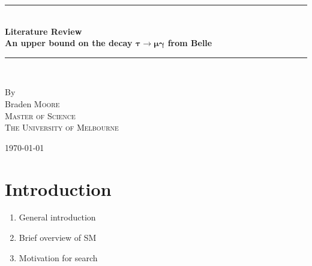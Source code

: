 \documentclass[a4paper]{article} %
\begin{document}
\pagestyle{empty}

\newcommand{\HRule}{\rule{\linewidth}{0.5mm}}

\begin{titlepage}

    \begin{center}
        \vspace*{5cm}

        \HRule \\[0.75cm]
        \huge \textbf{Literature Review} \\[0.5cm]
		\Huge \textbf{An upper bound on the decay $\bm{\tau\to\mu \gamma}$ from Belle}\\[0.5cm]
        \HRule \\[1.5cm]
        \begin{minipage}{0.4\textwidth}
        \begin{center}

        \large By \\[0.75cm]
        \huge Braden \scshape Moore \\[0.5cm]
        \normalsize \normalfont Master of Science \\
        The University of Melbourne \\

        \end{center}
        \end{minipage}

        \vfill

        \large \today
    \end{center}


\newpage
\end{titlepage}
\pagestyle{empty}
\tableofcontents
\newpage

\pagestyle{fancy}
\lfoot{\textsc{\today}}
\setcounter{page}{1}
\section{Introduction}
\begin{enumerate}
\item General introduction
\item Brief overview of SM
\item Motivation for search
\end{enumerate}
\end{document}
